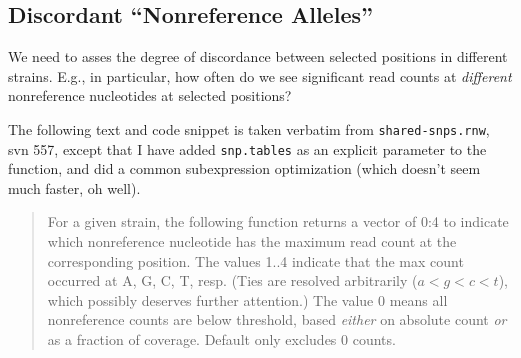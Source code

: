 \documentclass{article}\usepackage[]{graphicx}\usepackage[]{color}
\begin{document}
\subsection{Discordant ``Nonreference Alleles''}
\label{sec:discord}

We need to asses the degree of discordance between selected positions in different strains.  E.g., in particular, how often do we see significant read counts at \emph{different} nonreference nucleotides at selected positions?

The following text and code snippet is taken verbatim from \texttt{shared-snps.rnw}, svn 557, except that I have added \texttt{snp.tables} as an explicit parameter to the function, and did a common subexpression optimization (which doesn't seem much faster, oh well).

\begin{quote}
For a given strain, the following function returns a vector of 0:4 to indicate which nonreference nucleotide has the
maximum read count at the corresponding position.  The values 1..4 indicate that the max count occurred at A, G, C, T,
resp.  (Ties are resolved arbitrarily ($a<g<c<t$), which possibly deserves further attention.)  The value 0 means all
nonreference counts are below threshold, based \emph{either} on absolute count \emph{or} as a fraction of coverage.
Default only excludes 0 counts.


\end{quote}
\end{document}
